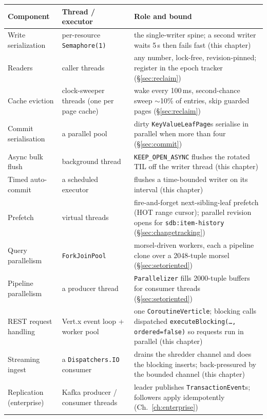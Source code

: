 \documentclass[11pt,a4paper,oneside]{report}
\theoremstyle{sirixthm}
\newcommand{\code}[1]{\texttt{#1}}
\begin{document}
{\small
\begin{xltabular}{\linewidth}{@{}>{\RaggedRight\arraybackslash}p{0.27\textwidth} >{\RaggedRight\arraybackslash}p{0.21\textwidth} >{\RaggedRight\arraybackslash}X@{}}
\toprule
\textbf{Component} & \textbf{Thread / executor} & \textbf{Role and bound}\\
\midrule
\endhead
Write serialization & per-resource \code{Semaphore(1)} & the single-writer spine; a second writer waits 5\,s then fails fast (this chapter)\\
Readers & caller threads & any number, lock-free, revision-pinned; register in the epoch tracker (\S\ref{sec:reclaim})\\
Cache eviction & clock-sweeper threads (one per page cache) & wake every 100\,ms, second-chance sweep $\sim$10\% of entries, skip guarded pages (\S\ref{sec:reclaim})\\
Commit serialisation & a parallel pool & dirty \code{KeyValueLeafPage}s serialise in parallel when more than four (\S\ref{sec:commit})\\
Async bulk flush & background thread & \code{KEEP\_OPEN\_ASYNC} flushes the rotated TIL off the writer thread (this chapter)\\
Timed auto-commit & a scheduled executor & flushes a time-bounded writer on its interval (this chapter)\\
Prefetch & virtual threads & fire-and-forget next-sibling-leaf prefetch (HOT range cursor); parallel revision opens for \code{sdb:item-history} (\S\ref{sec:changetracking})\\
Query parallelism & \code{ForkJoinPool} & morsel-driven workers, each a pipeline clone over a 2048-tuple morsel (\S\ref{sec:setoriented})\\
Pipeline parallelism & a producer thread & \code{Parallelizer} fills 2000-tuple buffers for consumer threads (\S\ref{sec:setoriented})\\
REST request handling & Vert.x event loop {+} worker pool & one \code{CoroutineVerticle}; blocking calls dispatched \code{executeBlocking(\ldots, ordered=false)} so requests run in parallel (this chapter)\\
Streaming ingest & a \code{Dispatchers.IO} consumer & drains the shredder channel and does the blocking inserts; back-pressured by the bounded channel (this chapter)\\
Replication (enterprise) & Kafka producer / consumer threads & leader publishes \code{TransactionEvent}s; followers apply idempotently (Ch.~\ref{ch:enterprise})\\
\bottomrule
\end{xltabular}}
\end{document}
